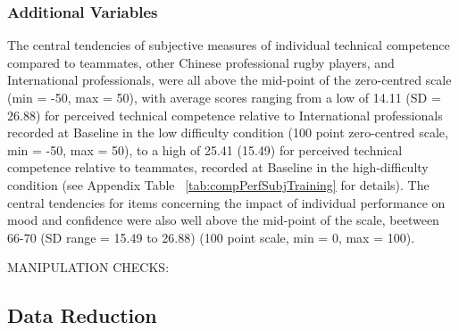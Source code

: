 \subsubsection{Additional Variables\label{app6:additionalVariables}}







The central tendencies of subjective measures of individual technical competence compared to teammates, other Chinese professional rugby players, and International professionals, were all above the mid-point of the zero-centred scale (min = -50, max = 50), with average scores ranging from  a low of 14.11 (SD = 26.88) for perceived technical competence relative to International professionals recorded at Baseline in the low difficulty condition (100 point zero-centred scale, min = -50, max = 50), to a high of 25.41 (15.49) for perceived technical competence relative to teammates, recorded at Baseline in the high-difficulty condition (see Appendix Table ~\ref{tab:compPerfSubjTraining} for details).  The central tendencies for items concerning the impact of individual performance on mood and confidence were also well above the mid-point of the scale, beetween 66-70 (SD range = 15.49 to 26.88) (100 point scale, min = 0, max = 100).




MANIPULATION CHECKS:









\subsection{Data Reduction\label{app6:dataReduction}}





